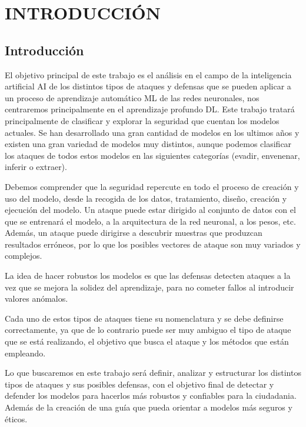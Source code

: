 \chapter{INTRODUCCIÓN}
\label{ch:1}

\section{Introducción}

El objetivo principal de este trabajo es el análisis en el campo de la inteligencia artificial \gls{AI} de los distintos tipos de ataques y defensas que se pueden aplicar a un proceso de aprendizaje automático \gls{ML} de las redes neuronales, nos centraremos principalmente en el aprendizaje profundo \gls{DL}.
Este trabajo tratará principalmente de clasificar y explorar la seguridad que cuentan los modelos actuales.
Se han desarrollado una gran cantidad de modelos en los ultimos años y existen una gran variedad de modelos muy distintos, aunque podemos clasificar los ataques de todos estos modelos en las siguientes categorías (evadir, envenenar, inferir o extraer).

Debemos comprender que la seguridad repercute en todo el proceso de creación y uso del modelo, desde la recogida de los datos, tratamiento, diseño, creación y ejecución del modelo.
Un ataque puede estar dirigido al conjunto de datos con el que se entrenará el modelo, a la arquitectura de la red neuronal, a los pesos, etc.
Además, un ataque puede dirigirse a descubrir muestras que produzcan resultados erróneos, por lo que los posibles vectores de ataque son muy variados y complejos.

La idea de hacer robustos los modelos es que las defensas detecten ataques a la vez que se mejora la solidez del aprendizaje, para no cometer fallos al introducir valores anómalos.

Cada uno de estos tipos de ataques tiene su nomenclatura y se debe definirse correctamente, ya que de lo contrario puede ser muy ambiguo el tipo de ataque que se está realizando, el objetivo que busca el ataque y los métodos que están empleando.

Lo que buscaremos en este trabajo será definir, analizar y estructurar los distintos tipos de ataques y sus posibles defensas, con el objetivo final de detectar y defender los modelos para hacerlos más robustos y confiables para la ciudadania.
Además de la creación de una guía que pueda orientar a modelos más seguros y éticos.



